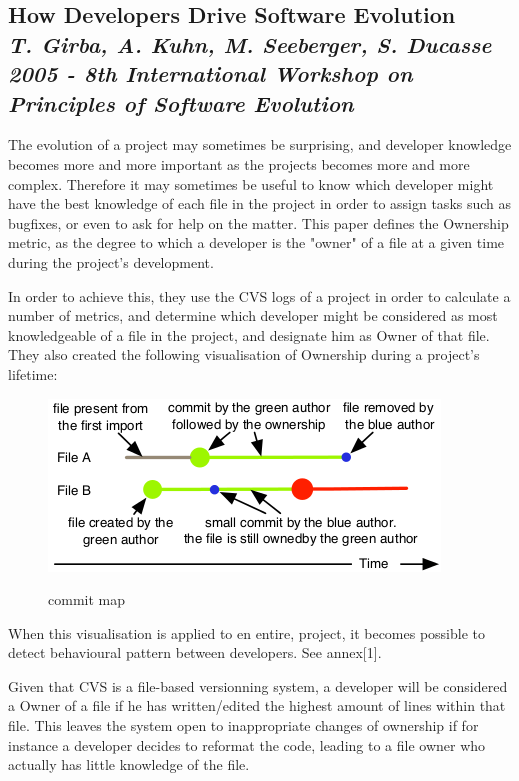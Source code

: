 \subsection{How Developers Drive Software Evolution\\ \textit{T. Girba, A. Kuhn, M. Seeberger, S. Ducasse\\
2005 - 8th International Workshop on Principles of Software Evolution}}

The evolution of a project may sometimes be surprising, and developer knowledge becomes more and more important as the projects becomes more and more complex. Therefore it may sometimes be useful to know which developer might have the best knowledge of each file in the project in order to assign tasks such as bugfixes, or even to ask for help on the matter.
This paper defines the Ownership metric, as the degree to which a developer is the "owner" of a file at a given time during the project's development.

In order to achieve this, they use the CVS logs of a project in order to calculate a number of metrics, and determine which developer might be considered as most knowledgeable of a file in the project, and designate him as Owner of that file.
They also created the following visualisation of Ownership during a project's lifetime:

\begin{figure}[H]
\includegraphics[keepaspectratio=true,scale=0.5]{./resources/girba2005.png}~
\caption{commit map}
\label{fig:commit_map}
\end{figure}

When this visualisation is applied to en entire, project, it becomes possible to detect behavioural pattern between developers. See annex[1].

Given that CVS is a file-based versionning system, a developer will be considered a Owner of a file if he has written/edited the highest amount of lines within that file. This leaves the system open to inappropriate changes of ownership if for instance a developer decides to reformat the code, leading to a file owner who actually has little knowledge of the file.

